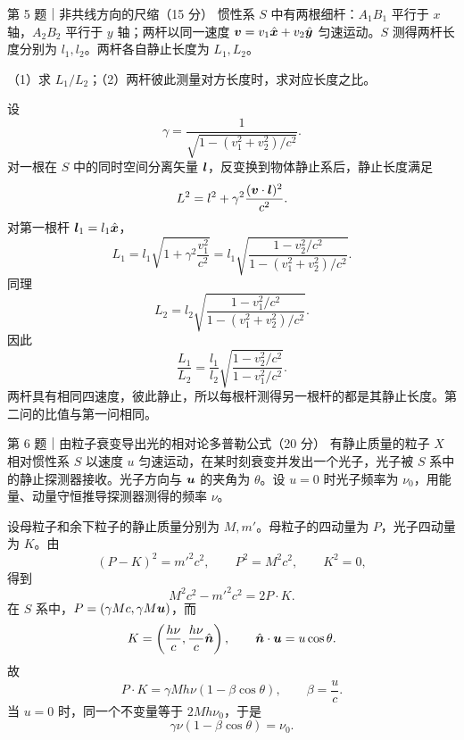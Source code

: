 \begin{problem}{第 5 题｜非共线方向的尺缩（15 分）}
惯性系 $S$ 中有两根细杆：$A_1B_1$ 平行于 $x$ 轴，$A_2B_2$ 平行于 $y$ 轴；两杆以同一速度 $\bm{v}=v_1\hat{\bm{x}}+v_2\hat{\bm{y}}$ 匀速运动。$S$ 测得两杆长度分别为 $l_1,l_2$。两杆各自静止长度为 $L_1,L_2$。

（1）求 $L_1/L_2$；（2）两杆彼此测量对方长度时，求对应长度之比。
\FigMovingRods
\end{problem}
\begin{solution}
设
\[
\gamma=\frac1{\sqrt{1-(v_1^2+v_2^2)/c^2}}.
\]
对一根在 $S$ 中的同时空间分离矢量 $\bm{l}$，反变换到物体静止系后，静止长度满足
\[
L^2=l^2+\gamma^2\frac{(\bm{v}\cdot\bm{l})^2}{c^2}.
\]
对第一根杆 $\bm{l}_1=l_1\hat{\bm{x}}$，
\[
L_1=l_1\sqrt{1+\gamma^2\frac{v_1^2}{c^2}}
=l_1\sqrt{\frac{1-v_2^2/c^2}{1-(v_1^2+v_2^2)/c^2}}.
\]
同理
\[
L_2=l_2\sqrt{\frac{1-v_1^2/c^2}{1-(v_1^2+v_2^2)/c^2}}.
\]
因此
\[
\frac{L_1}{L_2}
=\frac{l_1}{l_2}\sqrt{\frac{1-v_2^2/c^2}{1-v_1^2/c^2}}.
\]
两杆具有相同四速度，彼此静止，所以每根杆测得另一根杆的都是其静止长度。第二问的比值与第一问相同。
\end{solution}

\begin{problem}{第 6 题｜由粒子衰变导出光的相对论多普勒公式（20 分）}
有静止质量的粒子 $X$ 相对惯性系 $S$ 以速度 $u$ 匀速运动，在某时刻衰变并发出一个光子，光子被 $S$ 系中的静止探测器接收。光子方向与 $\bm{u}$ 的夹角为 $\theta$。设 $u=0$ 时光子频率为 $\nu_0$，用能量、动量守恒推导探测器测得的频率 $\nu$。
\FigDoppler
\end{problem}
\begin{solution}
设母粒子和余下粒子的静止质量分别为 $M,m'$。母粒子的四动量为 $P$，光子四动量为 $K$。由
\[
(P-K)^2=m'^2c^2,
\qquad P^2=M^2c^2,
\qquad K^2=0,
\]
得到
\[
M^2c^2-m'^2c^2=2P\cdot K.
\]
在 $S$ 系中，$P=(\gamma Mc,\gamma M\bm{u})$，而
\[
K=\left(\frac{h\nu}{c},\frac{h\nu}{c}\hat{\bm{n}}\right),
\qquad \hat{\bm{n}}\cdot\bm{u}=u\cos\theta.
\]
故
\[
P\cdot K=\gamma Mh\nu(1-\beta\cos\theta),
\qquad \beta=\frac{u}{c}.
\]
当 $u=0$ 时，同一个不变量等于 $2Mh\nu_0$，于是
\[
\gamma\nu(1-\beta\cos\theta)=\nu_0.
\]
\end{solution}
